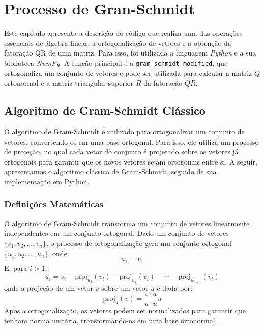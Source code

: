 \chapter{Processo de Gran-Schmidt}

Este capítulo apresenta a descrição do código que realiza uma das operações essenciais de álgebra linear: a ortogonalização de vetores e a obtenção da fatoração QR de uma matriz. Para isso, foi utilizada a linguagem \textit{Python} e a sua biblioteca \textit{NumPy}. A função principal é a \texttt{gram\_schmidt\_modified}, que ortogonaliza um conjunto de vetores e pode ser utilizada para calcular a matriz $Q$ ortonormal e a matriz triangular superior $R$ da fatoração $QR$.

\section{Algoritmo de Gram-Schmidt Clássico}

O algoritmo de Gram-Schmidt é utilizado para ortogonalizar um conjunto de vetores, convertendo-os em uma base ortogonal. Para isso, ele utiliza um processo de projeção, no qual cada vetor do conjunto é projetado sobre os vetores já ortogonais para garantir que os novos vetores sejam ortogonais entre si. A seguir, apresentamos o algoritmo clássico de Gram-Schmidt, seguido de sua implementação em Python.

\subsection{Definições Matemáticas}

O algoritmo de Gram-Schmidt transforma um conjunto de vetores linearmente independentes em um conjunto ortogonal. Dado um conjunto de vetores \(\{v_1, v_2, \dots, v_n\}\), o processo de ortogonalização gera um conjunto ortogonal \(\{u_1, u_2, \dots, u_n\}\), onde:
\begin{equation}
  u_1 = v_1
\end{equation}
E, para \(i > 1\):
\begin{equation}
  u_i = v_i - \text{proj}_{u_1}(v_i) - \text{proj}_{u_2}(v_i) - \cdots - \text{proj}_{u_{i-1}}(v_i)
\end{equation}
onde a projeção de um vetor \(v\) sobre um vetor \(u\) é dada por:
\begin{equation}
  \text{proj}_u(v) = \frac{v \cdot u}{u \cdot u} u
\end{equation}
Após a ortogonalização, os vetores podem ser normalizados para garantir que tenham norma unitária, transformando-os em uma base ortonormal.

